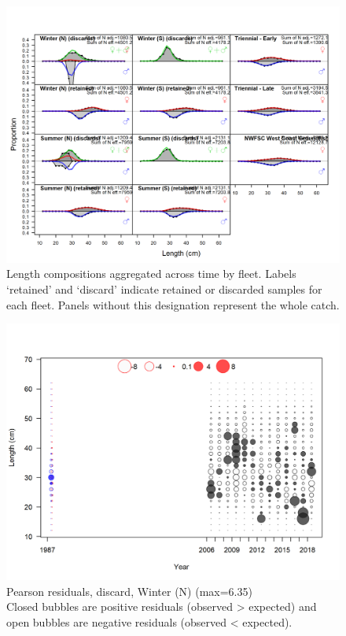 \documentclass[12pt,]{article}
\begin{document}
\FloatBarrier

\begin{figure}
\centering
\includegraphics{r4ss/plots_mod1/comp_lenfit__aggregated_across_time.png}
\caption{Length compositions aggregated across time by fleet. Labels
`retained' and `discard' indicate retained or discarded samples for each
fleet. Panels without this designation represent the whole catch.
\label{fig:length_agg}}
\end{figure}

\FloatBarrier

\begin{figure}
\centering
\includegraphics{r4ss/plots_mod1/comp_lenfit_residsflt1mkt1.png}
\caption{Pearson residuals, discard, Winter (N) (max=6.35)\\
Closed bubbles are positive residuals (observed \textgreater{} expected)
and open bubbles are negative residuals (observed \textless{} expected).
\label{fig:discard_wn_len_pearson}}
\end{figure}
\end{document}
